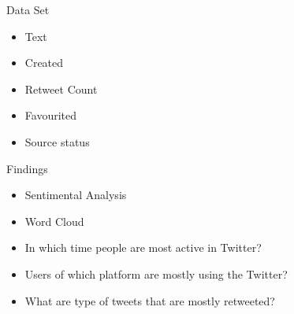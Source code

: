 \documentclass[14pt]{beamer}
\begin{document}
\begin{frame}{Data Set}
  \begin{itemize}
  \item Text
    \pause
  \item Created 
    \pause
  \item Retweet Count
    \pause
  \item Favourited
    \pause
  \item Source status
  \end{itemize}
\end{frame}
\begin{frame}{Findings }
  \begin{itemize}
      \item Sentimental Analysis
     \item Word Cloud
     \pause
     \item  In which time people are most active in Twitter?
     \pause
     \item Users of which platform are mostly using the Twitter?
     \pause
     \item What are type of tweets that are  mostly retweeted?
  \end{itemize}
\end{frame}
\end{document}

